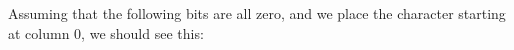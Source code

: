 \documentclass[10pt]{report}
\begin{document}
Assuming that the following bits are all zero, and we place the
character starting at column 0, we should see this:

\begin{center}
\end{center}
\end{document}
